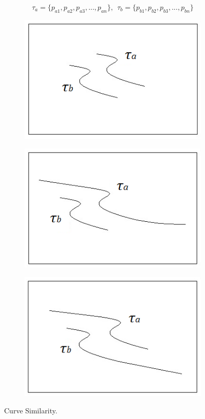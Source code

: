 \documentclass[a4paper,12pt]{article}
\begin{document}
\[
	\tau_a = \{p_{a1}, p_{a2}, p_{a3}, ..., p_{an}\},~~\tau_b = \{p_{b1}, p_{b2}, p_{b3}, ..., p_{bn}\}
\]

\begin{figure}[htbp]
	\centering
	\begin{subfigure}{0.32\textwidth}
		 \centering
		 \label{fig:fig3a}
		 \includegraphics[scale=0.6]{similar_a}
		 \caption{}
	\end{subfigure}
	\hfill 
	\begin{subfigure}{0.32\textwidth}
		 \centering
		 \label{fig:fig3b}
		 \includegraphics[scale=0.6]{similar_b}
		 \caption{}
	\end{subfigure}
	\hfill 
	\begin{subfigure}{0.32\textwidth}
		 \centering
		 \label{fig:fig3c}
		 \includegraphics[scale=0.6]{similar_c}
		 \caption{}
	\end{subfigure}	
	\caption{Curve Similarity.}
	\label{fig:fig3}
\end{figure}
\end{document}
